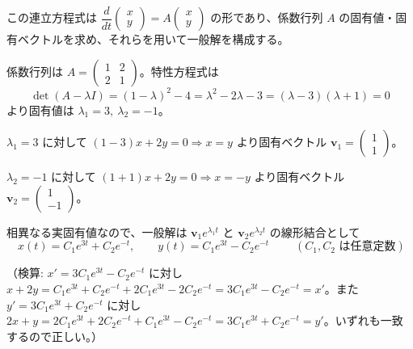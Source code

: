 
この連立方程式は $\dfrac{d}{dt}\begin{pmatrix} x \\ y \end{pmatrix} = A \begin{pmatrix} x \\ y \end{pmatrix}$ の形であり、係数行列 $A$ の固有値・固有ベクトルを求め、それらを用いて一般解を構成する。

係数行列は $A = \begin{pmatrix} 1 & 2 \\ 2 & 1 \end{pmatrix}$。特性方程式は
\[
\det(A - \lambda I) = (1-\lambda)^{2} - 4 = \lambda^{2} - 2\lambda - 3 = (\lambda - 3)(\lambda + 1) = 0
\]
より固有値は $\lambda_{1} = 3,\ \lambda_{2} = -1$。

\noindent
$\lambda_{1} = 3$ に対して $(1-3)x + 2y = 0 \Rightarrow x = y$ より固有ベクトル $\bm{v}_{1} = \begin{pmatrix} 1 \\ 1 \end{pmatrix}$。

\noindent
$\lambda_{2} = -1$ に対して $(1+1)x + 2y = 0 \Rightarrow x = -y$ より固有ベクトル $\bm{v}_{2} = \begin{pmatrix} 1 \\ -1 \end{pmatrix}$。

\noindent
相異なる実固有値なので、一般解は $\bm{v}_{1}e^{\lambda_1 t}$ と $\bm{v}_{2}e^{\lambda_2 t}$ の線形結合として
\[
\boxed{\;
x(t) = C_{1} e^{3t} + C_{2} e^{-t}, \qquad
y(t) = C_{1} e^{3t} - C_{2} e^{-t}
\;}
\qquad (C_{1}, C_{2} \text{ は任意定数})
\]

（検算: $x' = 3C_{1}e^{3t} - C_{2}e^{-t}$ に対し $x + 2y = C_{1}e^{3t}+C_{2}e^{-t}+2C_{1}e^{3t}-2C_{2}e^{-t} = 3C_{1}e^{3t}-C_{2}e^{-t} = x'$。また $y' = 3C_{1}e^{3t}+C_{2}e^{-t}$ に対し $2x+y = 2C_{1}e^{3t}+2C_{2}e^{-t}+C_{1}e^{3t}-C_{2}e^{-t} = 3C_{1}e^{3t}+C_{2}e^{-t} = y'$。いずれも一致するので正しい。）
